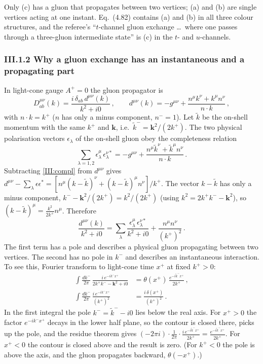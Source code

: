 Only (c) has a gluon that propagates between two vertices; (a) and (b) are single vertices acting at one instant. Eq.~(4.82) contains (a) and (b) in all three colour structures, and the referee's ``$t$-channel gluon exchange \dots\ where one passes through a three-gluon intermediate state'' is (c) in the $t$- and $u$-channels.

\FigThreeKinds

\subsubsection*{III.1.2 Why a gluon exchange has an instantaneous and a propagating part}

In light-cone gauge $A^+=0$ the gluon propagator is
\begin{equation}
D^{\mu\nu}_{ab}(k)=\frac{i\,\delta_{ab}\,d^{\mu\nu}(k)}{k^2+i0}\,,\qquad
d^{\mu\nu}(k)=-g^{\mu\nu}+\frac{n^\mu k^\nu+k^\mu n^\nu}{n\cdot k}\,,
\label{III:prop}
\end{equation}
with $n\cdot k=k^+$ ($n$ has only a minus component, $n^-=1$). Let $\tilde k$ be the on-shell momentum with the same $k^+$ and $\mathbf k$, i.e.\ $\tilde k^-=\mathbf k^2/(2k^+)$. The two physical polarisation vectors $\epsilon_\lambda$ of the on-shell gluon obey the completeness relation
\begin{equation}
\sum_{\lambda=1,2}\epsilon^\mu_\lambda\,\epsilon^{\nu*}_\lambda=-g^{\mu\nu}+\frac{n^\mu\tilde k^\nu+\tilde k^\mu n^\nu}{n\cdot k}\,.
\label{III:compl}
\end{equation}
Subtracting \eqref{III:compl} from $d^{\mu\nu}$ gives $d^{\mu\nu}-\sum_\lambda\epsilon\epsilon^*=[n^\mu(k-\tilde k)^\nu+(k-\tilde k)^\mu n^\nu]/k^+$. The vector $k-\tilde k$ has only a minus component, $k^--\mathbf k^2/(2k^+)=k^2/(2k^+)$ (using $k^2=2k^+k^--\mathbf k^2$), so $(k-\tilde k)^\mu=\frac{k^2}{2k^+}n^\mu$. Therefore
\begin{equation}
\frac{d^{\mu\nu}(k)}{k^2+i0}=\sum_{\lambda}\frac{\epsilon^\mu_\lambda\,\epsilon^{\nu*}_\lambda}{k^2+i0}+\frac{n^\mu n^\nu}{(k^+)^2}\,.
\label{III:split}
\end{equation}
The first term has a pole and describes a physical gluon propagating between two vertices. The second has no pole in $k^-$ and describes an instantaneous interaction. To see this, Fourier transform to light-cone time $x^+$ at fixed $k^+>0$:
\begin{align}
\int\!\frac{dk^-}{2\pi}\,\frac{i\,e^{-ik^-x^+}}{2k^+k^--\mathbf k^2+i0}&=\theta(x^+)\,\frac{e^{-i\tilde k^-x^+}}{2k^+}\,,\nonumber\\
\int\!\frac{dk^-}{2\pi}\,\frac{i\,e^{-ik^-x^+}}{(k^+)^2}&=\frac{i\,\delta(x^+)}{(k^+)^2}\,.
\label{III:fourier}
\end{align}
In the first integral the pole $k^-=\tilde k^- - i0$ lies below the real axis. For $x^+>0$ the factor $e^{-ik^-x^+}$ decays in the lower half plane, so the contour is closed there, picks up the pole, and the residue theorem gives $(-2\pi i)\cdot\frac{1}{2\pi}\cdot\frac{i\,e^{-i\tilde k^-x^+}}{2k^+}=\frac{e^{-i\tilde k^-x^+}}{2k^+}$. For $x^+<0$ the contour is closed above and the result is zero. (For $k^+<0$ the pole is above the axis, and the gluon propagates backward, $\theta(-x^+)$.)


